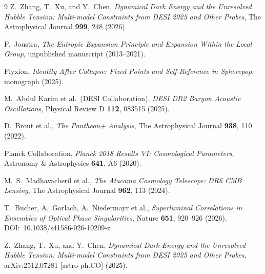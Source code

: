 \documentclass[12pt,a4paper]{article}
\theoremstyle{remark}
\begin{document}
\begin{thebibliography}{9}
Z.\ Zhang, T.\ Xu, and Y.\ Chen,
\textit{Dynamical Dark Energy and the Unresolved Hubble Tension: Multi-model Constraints from DESI 2025 and Other Probes},
The Astrophysical Journal \textbf{999}, 248 (2026).

P.\ Joustra,
\textit{The Entropic Expansion Principle and Expansion Within the Local Group},
unpublished manuscript (2013--2021).

Flyxion,
\textit{Identity After Collapse: Fixed Points and Self-Reference in Spherepop},
monograph (2025).

M.\ Abdul Karim et al.\ (DESI Collaboration),
\textit{DESI DR2 Baryon Acoustic Oscillations},
Physical Review D \textbf{112}, 083515 (2025).

D.\ Brout et al.,
\textit{The Pantheon+ Analysis},
The Astrophysical Journal \textbf{938}, 110 (2022).

Planck Collaboration,
\textit{Planck 2018 Results VI: Cosmological Parameters},
Astronomy \& Astrophysics \textbf{641}, A6 (2020).

M.\ S.\ Madhavacheril et al.,
\textit{The Atacama Cosmology Telescope: DR6 CMB Lensing},
The Astrophysical Journal \textbf{962}, 113 (2024).

T.\ Bucher, A.\ Gorlach, A.\ Niedermayr et al.,
\textit{Superluminal Correlations in Ensembles of Optical Phase Singularities},
Nature \textbf{651}, 920--926 (2026).
DOI:~10.1038/s41586-026-10209-z

Z.\ Zhang, T.\ Xu, and Y.\ Chen,
\textit{Dynamical Dark Energy and the Unresolved Hubble Tension: Multi-model Constraints from DESI 2025 and Other Probes},
arXiv:2512.07281 [astro-ph.CO] (2025).
\end{thebibliography}
\end{document}
